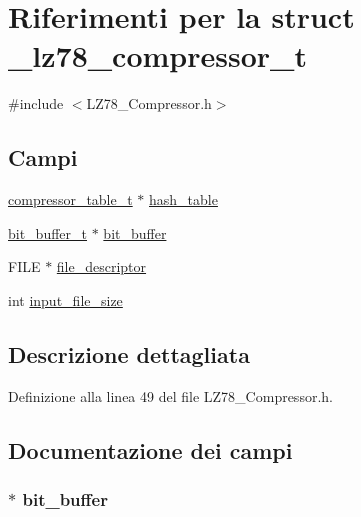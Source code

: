 \hypertarget{struct__lz78__compressor__t}{\section{Riferimenti per la struct \-\_\-lz78\-\_\-compressor\-\_\-t}
\label{struct__lz78__compressor__t}
}


{\ttfamily \#include $<$L\-Z78\-\_\-\-Compressor.\-h$>$}

\subsection*{Campi}
\begin{DoxyCompactItemize}
\item 
\hyperlink{_compressor__table_8h_a529ad42a2b30cf6fa0a4ee97143d38a8}{compressor\-\_\-table\-\_\-t} $\ast$ \hyperlink{struct__lz78__compressor__t_ab945a6bd56aa0252f14aa71761ab0653}{hash\-\_\-table}
\item 
\hyperlink{_bit__buffer__io_8h_a713e3f0b57038515d796b34e08f48fe0}{bit\-\_\-buffer\-\_\-t} $\ast$ \hyperlink{struct__lz78__compressor__t_ada27920eeaafe70a2886faddc0f071b1}{bit\-\_\-buffer}
\item 
F\-I\-L\-E $\ast$ \hyperlink{struct__lz78__compressor__t_a52a785c913c28c61f56c4aa10e3a1641}{file\-\_\-descriptor}
\item 
int \hyperlink{struct__lz78__compressor__t_a9dcb05a89ce187b840474a162322568a}{input\-\_\-file\-\_\-size}
\end{DoxyCompactItemize}


\subsection{Descrizione dettagliata}


Definizione alla linea 49 del file L\-Z78\-\_\-\-Compressor.\-h.



\subsection{Documentazione dei campi}
\hypertarget{struct__lz78__compressor__t_ada27920eeaafe70a2886faddc0f071b1}{
\subsubsection[{bit\-\_\-buffer}]{$\ast$ bit\-\_\-buffer}}\label{struct__lz78__compressor__t_ada27920eeaafe70a2886faddc0f071b1}


